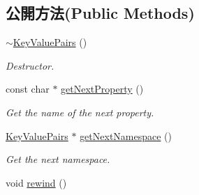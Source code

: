\subsection*{公開方法(Public Methods)}
\begin{DoxyCompactItemize}
\item 
\hyperlink{class_i_dream_sky_1_1_key_value_pairs_ac93689fe5daef2cb4bb6483773afcda5}{$\sim$\+Key\+Value\+Pairs} ()\hypertarget{class_i_dream_sky_1_1_key_value_pairs_ac93689fe5daef2cb4bb6483773afcda5}{}\label{class_i_dream_sky_1_1_key_value_pairs_ac93689fe5daef2cb4bb6483773afcda5}

\begin{DoxyCompactList}\small\item\em Destructor. \end{DoxyCompactList}\item 
const char $\ast$ \hyperlink{class_i_dream_sky_1_1_key_value_pairs_a27b208b167c0c7c45f22b8f38b34a116}{get\+Next\+Property} ()
\begin{DoxyCompactList}\small\item\em Get the name of the next property. \end{DoxyCompactList}\item 
\hyperlink{class_i_dream_sky_1_1_key_value_pairs}{Key\+Value\+Pairs} $\ast$ \hyperlink{class_i_dream_sky_1_1_key_value_pairs_abfb1c165f165bf9ff0fee62d252b38f1}{get\+Next\+Namespace} ()\hypertarget{class_i_dream_sky_1_1_key_value_pairs_abfb1c165f165bf9ff0fee62d252b38f1}{}\label{class_i_dream_sky_1_1_key_value_pairs_abfb1c165f165bf9ff0fee62d252b38f1}

\begin{DoxyCompactList}\small\item\em Get the next namespace. \end{DoxyCompactList}\item 
void \hyperlink{class_i_dream_sky_1_1_key_value_pairs_a9fcddec93fdeb506d5eafc96a01e10fc}{rewind} ()\hypertarget{class_i_dream_sky_1_1_key_value_pairs_a9fcddec93fdeb506d5eafc96a01e10fc}{}\label{class_i_dream_sky_1_1_key_value_pairs_a9fcddec93fdeb506d5eafc96a01e10fc}


\end{DoxyCompactItemize}
